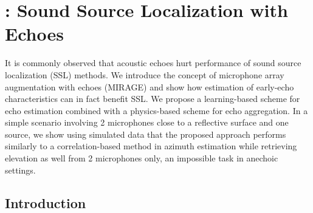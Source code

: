 \chapter{\mirage: Sound Source Localization with Echoes}\label{chap:mirage}

 It is commonly observed that acoustic echoes hurt performance of sound source localization (SSL) methods.
We introduce the concept of microphone array augmentation with echoes (MIRAGE) and
show how estimation of early-echo characteristics can in fact benefit SSL.
We propose a learning-based scheme for echo estimation combined with a physics-based scheme for echo aggregation.
In a simple scenario involving 2 microphones close to a reflective surface and one source,
we show using simulated data that the proposed approach performs similarly
to a correlation-based method in azimuth estimation while retrieving
elevation as well from 2 microphones only, an impossible task in anechoic settings.

\section{Introduction}






